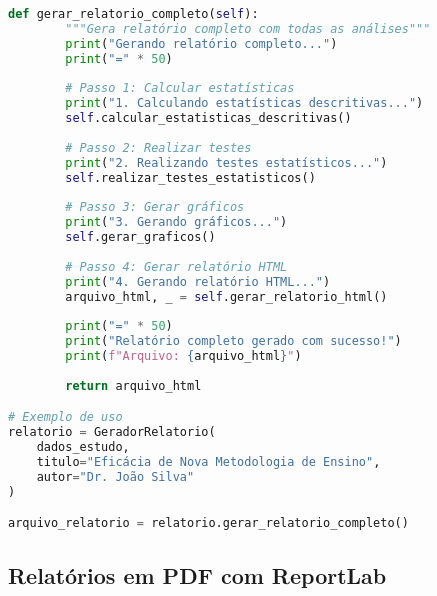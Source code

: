 \begin{pythonbox}
\begin{lstlisting}[language=Python]
    def gerar_relatorio_completo(self):
        """Gera relatório completo com todas as análises"""
        print("Gerando relatório completo...")
        print("=" * 50)
        
        # Passo 1: Calcular estatísticas
        print("1. Calculando estatísticas descritivas...")
        self.calcular_estatisticas_descritivas()
        
        # Passo 2: Realizar testes
        print("2. Realizando testes estatísticos...")
        self.realizar_testes_estatisticos()
        
        # Passo 3: Gerar gráficos
        print("3. Gerando gráficos...")
        self.gerar_graficos()
        
        # Passo 4: Gerar relatório HTML
        print("4. Gerando relatório HTML...")
        arquivo_html, _ = self.gerar_relatorio_html()
        
        print("=" * 50)
        print("Relatório completo gerado com sucesso!")
        print(f"Arquivo: {arquivo_html}")
        
        return arquivo_html

# Exemplo de uso
relatorio = GeradorRelatorio(
    dados_estudo, 
    titulo="Eficácia de Nova Metodologia de Ensino",
    autor="Dr. João Silva"
)

arquivo_relatorio = relatorio.gerar_relatorio_completo()
\end{lstlisting}
\end{pythonbox}

\subsection{Relatórios em PDF com ReportLab}

